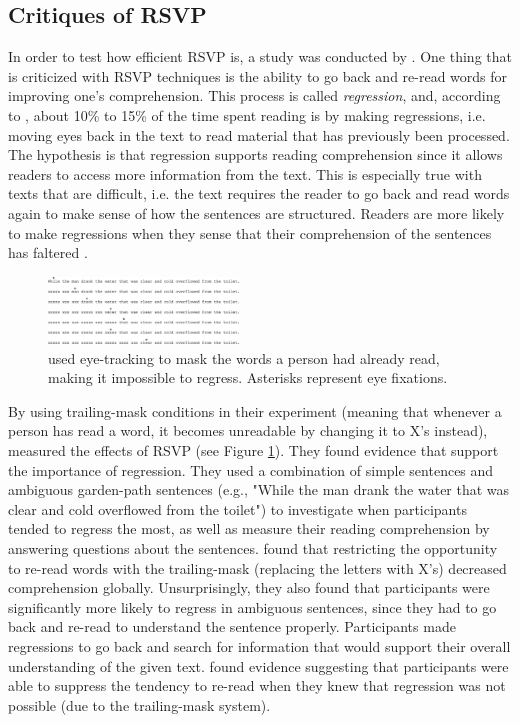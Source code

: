 \subsection{Critiques of RSVP}
In order to test how efficient RSVP is, a study was conducted by . One thing that is criticized with RSVP techniques is the ability to go back and re-read words for improving one's comprehension. This process is called \textit{regression}, and, according to \citeauthor{schotter_dont_2014}, about 10\% to 15\% of the time spent reading is by making regressions, i.e. moving eyes back in the text to read material that has previously been processed. The hypothesis is that regression supports reading comprehension since it allows readers to access more information from the text. This is especially true with texts that are difficult, i.e. the text requires the reader to go back and read words again to make sense of how the sentences are structured. Readers are more likely to make regressions when they sense that their comprehension of the sentences has faltered \cite{schotter_dont_2014}.

\begin{figure}[htbp]
\centering
\includegraphics[width=0.45\textwidth]{Pics/trace_crosses}
\caption{\protect\citeauthor{schotter_dont_2014} used eye-tracking to mask the words a person had already read, making it impossible to regress. Asterisks represent eye fixations. \protect\cite{schotter_dont_2014}}
\label{fig:trace_cross}
\end{figure}

By using trailing-mask conditions in their experiment (meaning that whenever a person has read a word, it becomes unreadable by changing it to X's instead),  measured the effects of RSVP (see Figure \ref{fig:trace_cross}). They found evidence that support the importance of regression. They used a combination of simple sentences and ambiguous garden-path sentences (e.g., "While
the man drank the water that was clear and cold overflowed from the toilet") to investigate when participants tended to regress the most, as well as measure their reading comprehension by answering questions about the sentences. \citeauthor{schotter_dont_2014} found that restricting the opportunity to re-read words with the trailing-mask (replacing the letters with X's) decreased comprehension globally. Unsurprisingly, they also found that participants were significantly more likely to regress in ambiguous sentences, since they had to go back and re-read to understand the sentence properly. Participants made regressions to go back and search for information that would support their overall understanding of the given text. \citeauthor{schotter_dont_2014} found evidence suggesting that participants were able to suppress the tendency to re-read when they knew that regression was not possible (due to the trailing-mask system).


